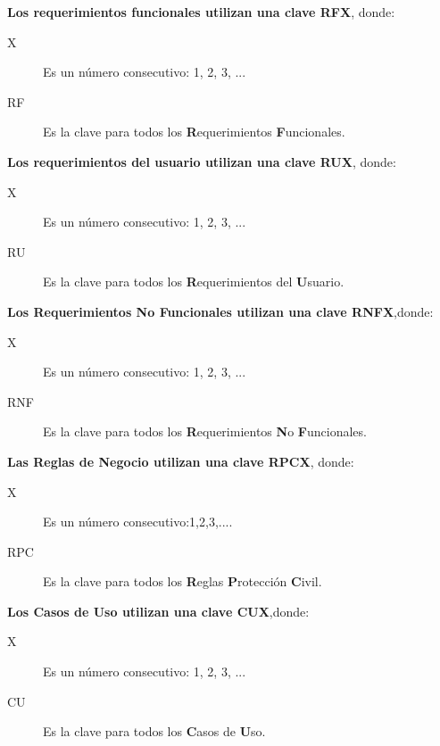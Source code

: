 {\bf Los requerimientos funcionales utilizan una clave RFX}, donde:
	
\begin{description}
	\item[X] Es un número consecutivo: 1, 2, 3, ...
	\item[RF] Es la clave para todos los {\bf R}equerimientos {\bf F}uncionales.\\
\end{description}



	{\bf Los requerimientos del usuario utilizan una clave RUX}, donde:
	
\begin{description}
	\item[X] Es un número consecutivo: 1, 2, 3, ...
	\item[RU] Es la clave para todos los {\bf R}equerimientos del {\bf U}suario.\\
\end{description}



{\bf Los Requerimientos No Funcionales utilizan una clave RNFX},donde:
\begin{description}
	\item[X] Es un número consecutivo: 1, 2, 3, ...
	\item[RNF] Es la clave para todos los {\bf R}equerimientos {\bf N}o {\bf F}uncionales.\\
\end{description}



{\bf Las Reglas de Negocio utilizan una clave RPCX}, donde:
\begin{description}
\item[X] Es un número consecutivo:1,2,3,....
\item[RPC] Es la clave para todos los {\bf R}eglas {\bf P}rotección {\bf C}ivil.\\
\end{description}



{\bf Los Casos de Uso  utilizan una clave CUX},donde:

\begin{description}
	\item[X] Es un número consecutivo: 1, 2, 3, ...
	\item[CU] Es la clave para todos los {\bf C}asos de {\bf U}so.\\
\end{description}


